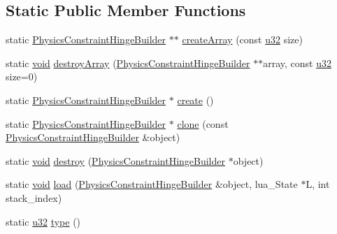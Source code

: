 \subsection*{Static Public Member Functions}
\begin{DoxyCompactItemize}
\item 
static \mbox{\hyperlink{classnjli_1_1_physics_constraint_hinge_builder}{Physics\+Constraint\+Hinge\+Builder}} $\ast$$\ast$ \mbox{\hyperlink{classnjli_1_1_physics_constraint_hinge_builder_a25525a2de723ed80a5db00bc013a7d83}{create\+Array}} (const \mbox{\hyperlink{_util_8h_a10e94b422ef0c20dcdec20d31a1f5049}{u32}} size)
\item 
static \mbox{\hyperlink{_thread_8h_af1e856da2e658414cb2456cb6f7ebc66}{void}} \mbox{\hyperlink{classnjli_1_1_physics_constraint_hinge_builder_a9f7bb6bccee74609eba62cf0067927f0}{destroy\+Array}} (\mbox{\hyperlink{classnjli_1_1_physics_constraint_hinge_builder}{Physics\+Constraint\+Hinge\+Builder}} $\ast$$\ast$array, const \mbox{\hyperlink{_util_8h_a10e94b422ef0c20dcdec20d31a1f5049}{u32}} size=0)
\item 
static \mbox{\hyperlink{classnjli_1_1_physics_constraint_hinge_builder}{Physics\+Constraint\+Hinge\+Builder}} $\ast$ \mbox{\hyperlink{classnjli_1_1_physics_constraint_hinge_builder_a6f6f4723d03bed6ed1b36345465aa139}{create}} ()
\item 
static \mbox{\hyperlink{classnjli_1_1_physics_constraint_hinge_builder}{Physics\+Constraint\+Hinge\+Builder}} $\ast$ \mbox{\hyperlink{classnjli_1_1_physics_constraint_hinge_builder_ac81051c05d79b7ee3bbd48c54dbdec63}{clone}} (const \mbox{\hyperlink{classnjli_1_1_physics_constraint_hinge_builder}{Physics\+Constraint\+Hinge\+Builder}} \&object)
\item 
static \mbox{\hyperlink{_thread_8h_af1e856da2e658414cb2456cb6f7ebc66}{void}} \mbox{\hyperlink{classnjli_1_1_physics_constraint_hinge_builder_a62a14c8bca5cd2075bf6a579f612baa0}{destroy}} (\mbox{\hyperlink{classnjli_1_1_physics_constraint_hinge_builder}{Physics\+Constraint\+Hinge\+Builder}} $\ast$object)
\item 
static \mbox{\hyperlink{_thread_8h_af1e856da2e658414cb2456cb6f7ebc66}{void}} \mbox{\hyperlink{classnjli_1_1_physics_constraint_hinge_builder_aaa23f647aba6ecc76db81cefcec07098}{load}} (\mbox{\hyperlink{classnjli_1_1_physics_constraint_hinge_builder}{Physics\+Constraint\+Hinge\+Builder}} \&object, lua\+\_\+\+State $\ast$L, int stack\+\_\+index)
\item 
static \mbox{\hyperlink{_util_8h_a10e94b422ef0c20dcdec20d31a1f5049}{u32}} \mbox{\hyperlink{classnjli_1_1_physics_constraint_hinge_builder_a630b25a403ccfbf3c0cb3c1372c36817}{type}} ()
\end{DoxyCompactItemize}
